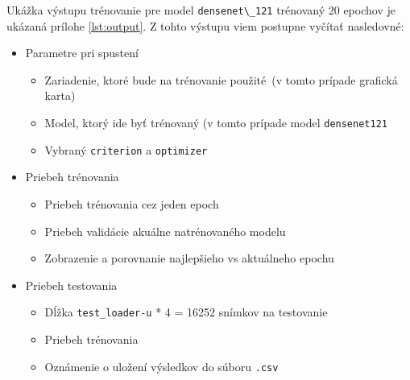 \documentclass[a4paper, 11pt]{article}
\begin{document}
Ukážka výstupu trénovanie pre model \verb|densenet\_121| trénovaný 20 epochov je ukázaná prílohe \ref{lst:output}. Z tohto výstupu viem postupne vyčítať nasledovné: 
\begin{itemize}

    \item Parametre pri spustení
\begin{itemize}
    \item Zariadenie, ktoré bude na trénovanie použité (v tomto prípade grafická karta)
    \item Model, ktorý ide byť trénovaný (v tomto prípade model \verb|densenet121| 
    \item Vybraný \verb|criterion| a \verb|optimizer| 
\end{itemize}

\item Priebeh trénovania
\begin{itemize}
    \item Priebeh trénovania cez jeden epoch
    \item Priebeh validácie akuálne natrénovaného modelu
    \item Zobrazenie a porovnanie najlepšieho vs aktuálneho epochu
\end{itemize}

\item Priebeh testovania
\begin{itemize}
    \item Dĺžka \verb|test_loader-u| * 4 =  16252 snímkov na testovanie
    \item  Priebeh trénovania 
    \item Oznámenie o uložení výsledkov do súboru \verb|.csv|
\end{itemize}


\end{itemize}
\end{document}
